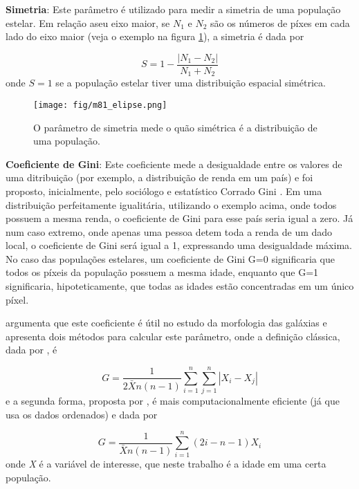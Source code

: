 \textbf{Simetria}: Este parâmetro é utilizado para medir a simetria de uma população estelar. Em relação aseu eixo maior, se $N_1$ e $N_2$ são os números de píxes em cada lado do eixo maior (veja o exemplo na figura \ref{figsym}), a simetria é dada por

\begin{equation}
S = 1 - \frac{|N_1 - N_2|}{N_1 + N_2}
\end{equation}
onde $S=1$ se a população estelar tiver uma distribuição espacial simétrica.

\begin{figure}[!ht]
\begin{center}
\texttt{[image: fig/m81\_elipse.png]}
\caption[Resumo da legenda da figura (aparece na lista de figuras)]{O parâmetro de simetria mede o quão simétrica é a distribuição de uma população.} 
\label{figsym}
\end{center}
\end{figure}

\textbf{Coeficiente de Gini}:
Este coeficiente mede a desigualdade entre os valores de uma ditribuição (por exemplo, a distribuição de renda em um país) e foi proposto, inicialmente, pelo sociólogo e estatístico Corrado Gini \citep{Gini}. Em uma distribuição perfeitamente igualitária, utilizando o exemplo acima, onde todos possuem a mesma renda, o coeficiente de Gini para esse país seria igual a zero. Já num caso extremo, onde apenas uma pessoa detem toda a renda de um dado local, o coeficiente de Gini será igual a 1, expressando uma desigualdade máxima. No caso das populações estelares, um coeficiente de Gini G=0 significaria que todos os píxeis da população possuem a mesma idade, enquanto que G=1 significaria, hipoteticamente, que todas as idades estão concentradas em um único píxel.

\citet{abraham} argumenta que este coeficiente é útil no estudo da morfologia das galáxias e apresenta dois métodos para calcular este parâmetro, onde a definição clássica, dada por \citet{Gini}, é 

\begin{equation}
G = \frac{1}{2\bar{X}n(n-1)} \sum_{i=1}^{n} \sum_{j=1}^{n}|X_i - X_j| 
\end{equation}
e a segunda forma, proposta por \citet{glasser}, é mais computacionalmente eficiente (já que usa os dados ordenados) e dada por

\begin{equation}
G = \frac{1}{\bar{X}n(n-1)}\sum_{i=1}^{n}(2i - n - 1)X_i
\end{equation}
onde \textit{X} é a variável de interesse, que neste trabalho é a idade em uma certa população.

